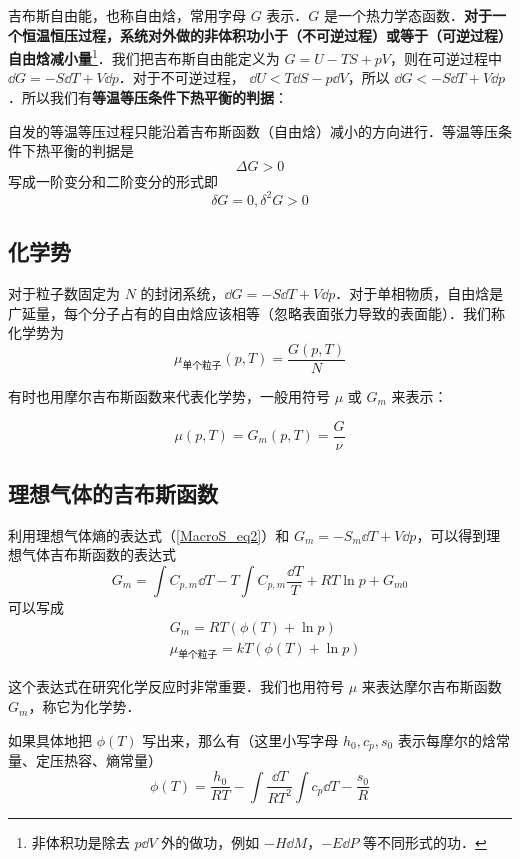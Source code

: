 

吉布斯自由能，也称自由焓，常用字母 $G$ 表示．$G$ 是一个热力学态函数．\textbf{对于一个恒温恒压过程，系统对外做的非体积功小于（不可逆过程）或等于（可逆过程）自由焓减小量}\footnote{非体积功是除去 $p\dd V$ 外的做功，例如 $-H\dd M$，$-E\dd P$ 等不同形式的功．}．我们把吉布斯自由能定义为 $G=U-TS+pV$，则在可逆过程中 $\dd G= -S\dd T+V\dd p$．对于不可逆过程， $\dd U<T\dd S-p\dd V$，所以 $\dd G<-S\dd T+V\dd p$．所以我们有\textbf{等温等压条件下热平衡的判据}：

自发的等温等压过程只能沿着吉布斯函数（自由焓）减小的方向进行．等温等压条件下热平衡的判据是
\begin{equation}
\Delta G>0
\end{equation}
写成一阶变分和二阶变分的形式即
\begin{equation}\label{GibbsG_eq2}
\delta G=0,\delta^2 G>0
\end{equation}

\subsection{化学势}

对于粒子数固定为 $N$ 的封闭系统，$\dd G=-S\dd T+V\dd p$．对于单相物质，自由焓是广延量，每个分子占有的自由焓应该相等（忽略表面张力导致的表面能）．我们称化学势为
\begin{equation}
\mu_{\text{单个粒子}}(p,T)=\frac{G(p,T)}{N}
\end{equation}

有时也用摩尔吉布斯函数来代表化学势，一般用符号 $\mu$ 或 $G_m$ 来表示：

\begin{equation}\label{GibbsG_eq1}
\mu(p,T)=G_m(p,T)=\frac{G}{\nu}
\end{equation}

\subsection{理想气体的吉布斯函数}
利用理想气体熵的表达式（\autoref{MacroS_eq2}）和 $G_m=-S_m\dd T+V\dd p$，可以得到理想气体吉布斯函数的表达式
\begin{equation}
G_m=\int C_{p,m} \dd T - T\int C_{p,m} \frac{\dd T}{T}+RT\ln p+G_{m0}
\end{equation}
可以写成
\begin{equation}\label{GibbsG_eq3}
\begin{aligned}
&G_m=RT(\phi(T)+\ln p)\\
&\mu_{\text{单个粒子}} = kT(\phi(T)+\ln p)
\end{aligned}
\end{equation}

这个表达式在研究化学反应时非常重要．我们也用符号 $\mu$ 来表达摩尔吉布斯函数 $G_m$，称它为化学势．

如果具体地把 $\phi(T)$ 写出来，那么有（这里小写字母 $h_0,c_p,s_0$ 表示每摩尔的焓常量、定压热容、熵常量）
\begin{equation}
\phi(T)=\frac{h_{0}}{RT}-\int\frac{\dd T}{RT^2}\int c_{p}\dd T-\frac{s_{0}}{R}
\end{equation}

